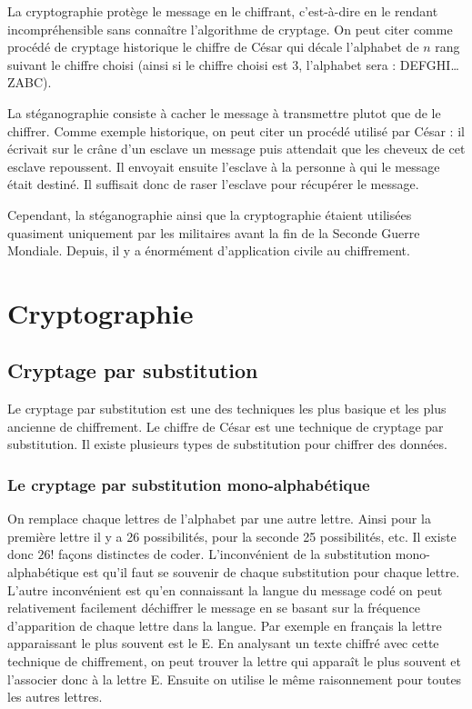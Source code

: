 \documentclass[a4paper,12pt]{article}
\begin{document}
La cryptographie protège le message en le chiffrant, c'est-à-dire en le rendant incompréhensible sans connaître l'algorithme de cryptage. On peut citer comme procédé de cryptage historique le chiffre de César qui décale l'alphabet de $n$ rang suivant le chiffre choisi (ainsi si le chiffre choisi est 3, l'alphabet sera : DEFGHI\dots{}ZABC).

La stéganographie consiste à cacher le message à transmettre plutot que de le chiffrer. Comme exemple historique, on peut citer un procédé utilisé par César : il écrivait sur le crâne d'un esclave un message puis attendait que les cheveux de cet esclave repoussent. Il envoyait ensuite l'esclave à la personne à qui le message était destiné. Il suffisait donc de raser l'esclave pour récupérer le message.

Cependant, la stéganographie ainsi que la cryptographie étaient utilisées quasiment uniquement par les militaires avant la fin de la Seconde Guerre Mondiale. Depuis, il y a énormément d'application civile au chiffrement.

\section{Cryptographie}

\subsection{Cryptage par substitution}

Le cryptage par substitution est une des techniques les plus basique et les plus ancienne de chiffrement. Le chiffre de César est une technique de cryptage par substitution. Il existe plusieurs types de substitution pour chiffrer des données.

\subsubsection{Le cryptage par substitution mono-alphabétique}

On remplace chaque lettres de l'alphabet par une autre lettre. Ainsi pour la première lettre il y a 26 possibilités, pour la seconde 25 possibilités, etc. Il existe donc $26!$ façons distinctes de coder. L'inconvénient de la substitution mono-alphabétique est qu'il faut se souvenir de chaque substitution pour chaque lettre. L'autre inconvénient est qu'en connaissant la langue du message codé on peut relativement facilement déchiffrer le message en se basant sur la fréquence d'apparition de chaque lettre dans la langue. Par exemple en français la lettre apparaissant le plus souvent est le E. En analysant un texte chiffré avec cette technique de chiffrement, on peut trouver la lettre qui apparaît le plus souvent et l'associer donc à la lettre E. Ensuite on utilise le même raisonnement pour toutes les autres lettres.
\end{document}
